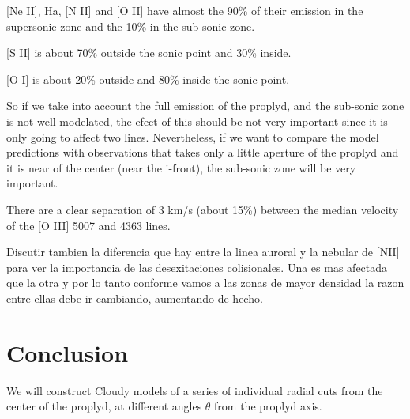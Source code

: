 \documentclass{article}
\begin{document}
[Ne II], Ha, [N II] and [O II] have almost the 90\% of their emission
in the supersonic zone and the 10\% in the sub-sonic zone.

[S II] is about 70\% outside the sonic point and 30\% inside.

[O I] is about 20\% outside and 80\% inside the sonic point.

So if we take into account the full emission of the proplyd, and the
sub-sonic zone is not well modelated, the efect of this should be not
very important since it is only going to affect two
lines. Nevertheless, if we want to compare the model predictions with
observations that takes only a little aperture of the proplyd and it
is near of the center (near the i-front), the sub-sonic zone will be
very important.

There are a clear separation of 3 km/s (about 15\%) between the median
velocity of the [O III] 5007 and 4363 lines.

Discutir tambien la diferencia que hay entre la linea auroral y la
nebular de [NII] para ver la importancia de las desexitaciones
colisionales. Una es mas afectada que la otra y por lo tanto conforme
vamos a las zonas de mayor densidad la razon entre ellas debe ir
cambiando, aumentando de hecho.

\section{Conclusion}
\label{sec:conclusions}

We will construct Cloudy models of a series of individual radial cuts from the center of the proplyd, at different angles $\theta$ from the proplyd axis.




\end{document}
